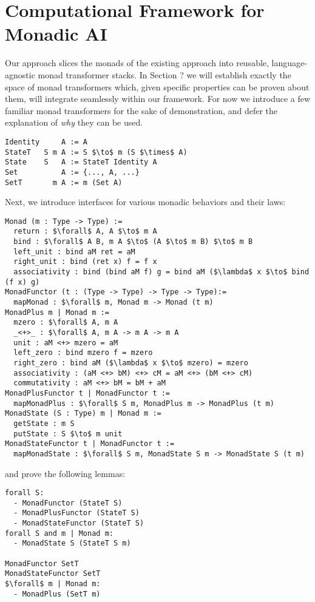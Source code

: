 
\section{Computational Framework for Monadic AI}
\label{section:computational}
Our approach slices the monads of the existing approach into reusable,
language-agnostic monad transformer stacks.
%
In Section ? we will establish exactly the space of monad transformers which,
given specific properties can be proven about them, will integrate seamlessly
within our framework.  For now we introduce a few familiar monad transformers
for the sake of demonstration, and defer the explanation of \textit{why} they
can be used.

\begin{minipage}{\linewidth}
\begin{lstlisting}
Identity     A := A
StateT   S m A := S $\to$ m (S $\times$ A)
State    S   A := StateT Identity A
Set          A := {..., A, ...}
SetT       m A := m (Set A)
\end{lstlisting}
\end{minipage}
Next, we introduce interfaces for various monadic behaviors and their laws:
\begin{minipage}{\linewidth}
\begin{lstlisting}
Monad (m : Type -> Type) :=
  return : $\forall$ A, A $\to$ m A
  bind : $\forall$ A B, m A $\to$ (A $\to$ m B) $\to$ m B
  left_unit : bind aM ret = aM
  right_unit : bind (ret x) f = f x
  associativity : bind (bind aM f) g = bind aM ($\lambda$ x $\to$ bind (f x) g)
MonadFunctor (t : (Type -> Type) -> Type -> Type):= 
  mapMonad : $\forall$ m, Monad m -> Monad (t m)
MonadPlus m | Monad m :=
  mzero : $\forall$ A, m A 
  _<+>_ : $\forall$ A, m A -> m A -> m A
  unit : aM <+> mzero = aM
  left_zero : bind mzero f = mzero
  right_zero : bind aM ($\lambda$ x $\to$ mzero) = mzero
  associativity : (aM <+> bM) <+> cM = aM <+> (bM <+> cM)
  commutativity : aM <+> bM = bM + aM
MonadPlusFunctor t | MonadFunctor t :=
  mapMonadPlus : $\forall$ S m, MonadPlus m -> MonadPlus (t m)
MonadState (S : Type) m | Monad m :=
  getState : m S
  putState : S $\to$ m unit
MonadStateFunctor t | MonadFunctor t := 
  mapMonadState : $\forall$ S m, MonadState S m -> MonadState S (t m)
\end{lstlisting}
and prove the following lemmas:
\begin{lstlisting}
forall S:
  - MonadFunctor (StateT S)
  - MonadPlusFunctor (StateT S)
  - MonadStateFunctor (StateT S)
forall S and m | Monad m:
  - MonadState S (StateT S m)

MonadFunctor SetT
MonadStateFunctor SetT
$\forall$ m | Monad m:
  - MonadPlus (SetT m)
\end{lstlisting}
\end{minipage}

